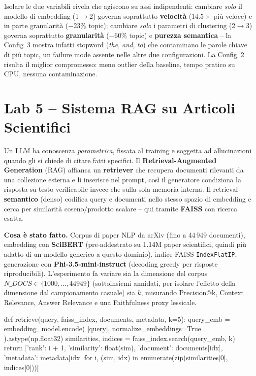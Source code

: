 \documentclass[11pt,a4paper]{article}
\begin{document}
Isolare le due variabili rivela che agiscono su assi indipendenti: cambiare \emph{solo} il modello di embedding (1$\to$2) governa soprattutto \textbf{velocità} ($14.5\times$ più veloce) e in parte granularità ($-23\%$ topic); cambiare \emph{solo} i parametri di clustering (2$\to$3) governa soprattutto \textbf{granularità} ($-60\%$ topic) e \textbf{purezza semantica} -- la Config~3 mostra infatti stopword (\textit{the}, \textit{and}, \textit{to}) che contaminano le parole chiave di più topic, un failure mode assente nelle altre due configurazioni. La Config~2 risulta il miglior compromesso: meno outlier della baseline, tempo pratico su CPU, nessuna contaminazione.

\section{Lab 5 -- Sistema RAG su Articoli Scientifici}

\begin{theorybox}
Un LLM ha conoscenza \emph{parametrica}, fissata al training e soggetta ad allucinazioni quando gli si chiede di citare fatti specifici. Il \textbf{Retrieval-Augmented Generation} (RAG) affianca un \textbf{retriever} che recupera documenti rilevanti da una collezione esterna e li inserisce nel prompt, così il generatore condiziona la risposta su testo verificabile invece che sulla sola memoria interna. Il retrieval \textbf{semantico} (denso) codifica query e documenti nello stesso spazio di embedding e cerca per similarità coseno/prodotto scalare -- qui tramite \textbf{FAISS} con ricerca esatta.
\end{theorybox}

\textbf{Cosa è stato fatto.} Corpus di paper NLP da arXiv (fino a 44\,949 documenti), embedding con \textbf{SciBERT} (pre-addestrato su 1.14M paper scientifici, quindi più adatto di un modello generico a questo dominio), indice FAISS \texttt{IndexFlatIP}, generazione con \textbf{Phi-3.5-mini-instruct} (decoding greedy per risposte riproducibili). L'esperimento fa variare sia la dimensione del corpus $N\_DOCS \in \{1000,\ldots,44949\}$ (sottoinsiemi annidati, per isolare l'effetto della dimensione dal campionamento casuale) sia $k$, misurando Precision@k, Context Relevance, Answer Relevance e una Faithfulness proxy lessicale.

\begin{pylisting}[title={Retrieval semantico: query e corpus nello stesso spazio di embedding}]
def retrieve(query, faiss_index, documents, metadata, k=5):
    query_emb = embedding_model.encode(
        [query], normalize_embeddings=True
    ).astype(np.float32)
    similarities, indices = faiss_index.search(query_emb, k)
    return [{'rank': i + 1, 'similarity': float(sim),
             'document': documents[idx], 'metadata': metadata[idx]}
            for i, (sim, idx) in enumerate(zip(similarities[0], indices[0]))]
\end{pylisting}
\end{document}

